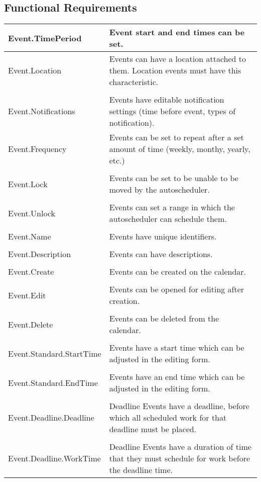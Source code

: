 \documentclass{scrreprt}
\begin{document}
\subsection{Functional Requirements}
\begin{center}
\begin{longtable}{ | p{6cm} | p{9cm} | }
\hline
Event.TimePeriod & Event start and end times can be set. \\
\hline
Event.Location & Events can have a location attached to them. Location events must have this characteristic. \\
& \\
Event.Notifications & Events have editable notification settings (time before event, types of notification).\\
\hline
Event.Frequency & Events can be set to repeat after a set amount of time (weekly, monthy, yearly, etc.) \\
& \\
Event.Lock & Events can be set to be unable to be moved by the autoscheduler. \\
& \\
Event.Unlock & Events can set a range in which the autoscheduler can schedule them.\\
& \\
Event.Name & Events have unique identifiers. \\
& \\
Event.Description & Events can have descriptions.\\
& \\
Event.Create & Events can be created on the calendar. \\
& \\
Event.Edit & Events can be opened for editing after creation. \\
& \\
Event.Delete & Events can be deleted from the calendar. \\
& \\
Event.Standard.StartTime & Events have a start time which can be adjusted in the editing form. \\
& \\
Event.Standard.EndTime & Events have an end time which can be adjusted in the editing form. \\
& \\
Event.Deadline.Deadline & Deadline Events have a deadline, before which all scheduled work for that deadline must be placed. \\
& \\
Event.Deadline.WorkTime & Deadline Events have a duration of time that they must schedule for work before the deadline time. \\
\hline
\end{longtable}
\end{center}
\end{document}
